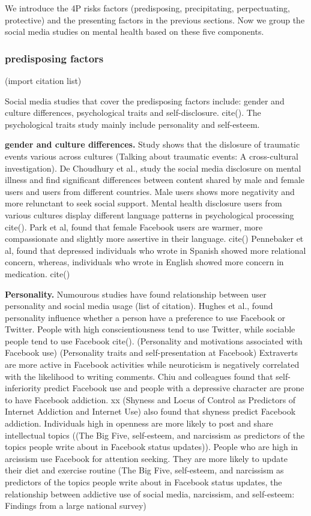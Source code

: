 We introduce the 4P risks factors (predisposing, precipitating, perpectuating, protective) and the presenting factors in the previous sections. Now we group the social media studies on mental health based on these five components. 

\subsubsection{predisposing factors} (import citation list)

Social media studies that cover the predisposing factors include: gender and culture differences, psychological traits and self-disclosure. cite(). The psychological traits study mainly include personality and self-esteem.

 \textbf{gender and culture differences.} Study shows that the dislosure of traumatic events various across cultures (Talking about traumatic events: A cross-cultural investigation). De Choudhury et al., study the social media disclosure on mental illness and find significant differences between content shared by male and female users and users from different countries. Male users shows more negativity and more relunctant to seek social support. Mental health disclosure users from various cultures display different language patterns in psychological processing cite(). Park et al, found that female Facebook users are warmer, more compassionate and slightly more assertive in their language. cite() Pennebaker et al, found that depressed individuals who wrote in Spanish showed more relational concern, whereas, individuals who wrote in English showed more concern in medication. cite()



 \textbf{Personality.} Numourous studies have found relationship between user personality and social media usage (list of citation). Hughes et al., found personality influence whether a person have a preference to use Facebook or Twitter. People with high conscientiousness tend to use Twitter, while sociable people tend to use Facebook cite().  (Personality and motivations associated with Facebook use) (Personality traits and self-presentation at Facebook) Extraverts are more active in Facebook activities while neuroticism is negatively correlated with the likelihood to writing comments. Chiu and colleagues found that self-inferiority predict Facebook use and people with a depressive character are prone to have Facebook addiction. xx (Shyness and Locus of Control as Predictors of Internet Addiction and Internet Use) also found that shyness predict Facebook addiction. Individuals high in openness are more likely to post and share intellectual topics ((The Big Five, self-esteem, and narcissism as predictors of the topics people write about in Facebook status updates)). People who are high in arcissism use Facebook for attention seeking. They are more likely to update their diet and exercise routine (The Big Five, self-esteem, and narcissism as predictors of the topics people write about in Facebook status updates, the relationship between addictive use of social media, narcissism, and self-esteem: Findings from a large national survey)

